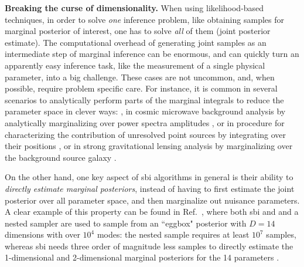 \noindent \textbf{Breaking the curse of dimensionality.} When using likelihood-based techniques, in order to solve \emph{one} inference problem, like obtaining samples for marginal posterior of interest, one has to solve \emph{all} of them (joint posterior estimate). The computational overhead of generating joint samples as an intermediate step of marginal inference can be enormous, and can quickly turn an apparently easy inference task, like the measurement of a single physical parameter, into a big challenge. These cases are not uncommon, and, when possible, require problem specific care. For instance, it is common in several scenarios to analytically perform parts of the marginal integrals to reduce the parameter space in clever ways: \eg, in cosmic microwave background analysis by analytically marginalizing over power spectra amplitudes \cite{Gerbino:2019okg}, or in procedure for characterizing the contribution of unresolved point sources by integrating over their positions \cite{Mishra-Sharma:2016gis}, or in strong gravitational lensing analysis by marginalizing over the background source galaxy \cite{Vegetti:2008eg}.

On the other hand, one key aspect of \gls*{sbi} algorithms in general is their ability to \emph{directly estimate marginal posteriors}, instead of having to first estimate the joint posterior over all parameter space, and then marginalize out nuisance parameters. A clear example of this property can be found in Ref.~\cite{Miller:2020hua}, where both \gls*{sbi} and and a nested sampler are used to sample from an ``eggbox" posterior with $D=14$ dimensions with over $10^4$ modes: the nested sample requires at least $10^7$ samples, whereas \gls*{sbi} needs three order of magnitude less samples to directly estimate the 1-dimensional and 2-dimensional marginal posteriors for the 14 parameters \cite[Figure 2 in][]{Miller:2020hua}. 



